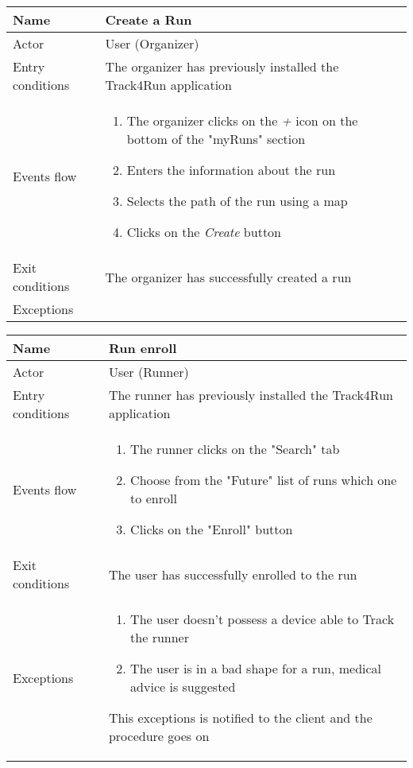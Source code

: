 \begin{table}[h!]
    \begin{tabular}{|l|p{12cm}|}
        \hline
        Name             & Create a Run \\ \hline
        Actor            & User (Organizer) \\ \hline
        Entry conditions & The organizer has previously installed the Track4Run application \\ \hline
        Events flow      & 
        \begin{enumerate}
            \item The organizer clicks on the \textit{+} icon on the bottom of the "myRuns" section
            \item Enters the information about the run
            \item Selects the path of the run using a map
            \item Clicks on the \textit{Create} button
        \end{enumerate} \\ \hline
        Exit conditions  & The organizer has successfully created a run \\ \hline
        Exceptions       & \\ \hline
    \end{tabular}
\end{table}

\newpage

\begin{table}[]
    \begin{tabular}{|l|p{12cm}|}
        \hline
        Name             & Run enroll \\ \hline
        Actor            & User (Runner)\\ \hline
        Entry conditions & The runner has previously installed the Track4Run application \\ \hline
        Events flow      & 
        \begin{enumerate}
            \item The runner clicks on the "Search" tab 
            \item Choose from the "Future" list of runs which one to enroll
            \item Clicks on the "Enroll" button
        \end{enumerate} \\ \hline
        Exit conditions  & The user has successfully enrolled to the run \\ \hline
        Exceptions       & 
        \begin{enumerate}
            \item The user doesn't possess a device able to Track the runner
            \item The user is in a bad shape for a run, medical advice is suggested
        \end{enumerate} This exceptions is notified to the client and the procedure goes on\\ \hline
    \end{tabular}
\end{table}

